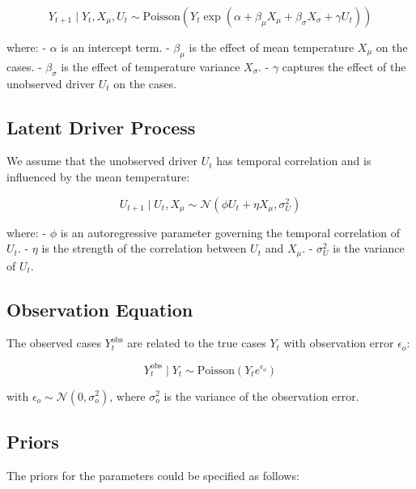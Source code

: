 \documentclass[
  letterpaper,
  DIV=11,
  numbers=noendperiod]{scrartcl}
\begin{document}
\begin{equation}
Y_{t+1} \mid Y_t, X_{\mu}, U_t \sim \text{Poisson} \left(Y_t \exp \left( \alpha + \beta_{\mu} X_{\mu} + \beta_{\sigma} X_{\sigma} + \gamma U_t \right)\right)
\end{equation}

where: - \(\alpha\) is an intercept term. - \(\beta_{\mu}\) is the
effect of mean temperature \(X_{\mu}\) on the cases. -
\(\beta_{\sigma}\) is the effect of temperature variance \(X_{\sigma}\).
- \(\gamma\) captures the effect of the unobserved driver \(U_t\) on the
cases.

\subsection{Latent Driver Process}\label{latent-driver-process}

We assume that the unobserved driver \(U_t\) has temporal correlation
and is influenced by the mean temperature:

\begin{equation}
U_{t+1} \mid U_t, X_{\mu} \sim \mathcal{N}(\phi U_t + \eta X_{\mu}, \sigma_U^2)
\end{equation}

where: - \(\phi\) is an autoregressive parameter governing the temporal
correlation of \(U_t\). - \(\eta\) is the strength of the correlation
between \(U_t\) and \(X_{\mu}\). - \(\sigma_U^2\) is the variance of
\(U_t\).

\subsection{Observation Equation}\label{observation-equation}

The observed cases \(Y_t^{\text{obs}}\) are related to the true cases
\(Y_t\) with observation error \(\epsilon_o\):

\begin{equation}
Y_t^{\text{obs}} \mid Y_t \sim \text{Poisson}(Y_t e^{\epsilon_o})
\end{equation}

with \(\epsilon_o \sim \mathcal{N}(0, \sigma_o^2)\), where
\(\sigma_o^2\) is the variance of the observation error.

\subsection{Priors}\label{priors}

The priors for the parameters could be specified as follows:
\end{document}
